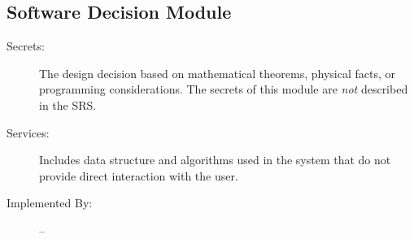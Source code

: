 \documentclass[12pt, titlepage]{article}
\newcommand{\mref}[1]{M\ref{#1}}
\begin{document}





\subsection{Software Decision Module}

\begin{description}
\item[Secrets:] The design decision based on mathematical theorems, physical facts, or programming considerations. The secrets of this module are
  \emph{not} described in the SRS.
\item[Services:] Includes data structure and algorithms used in the system that do not provide direct interaction with the user. 
\item[Implemented By:] --
\end{description}
\end{document}
